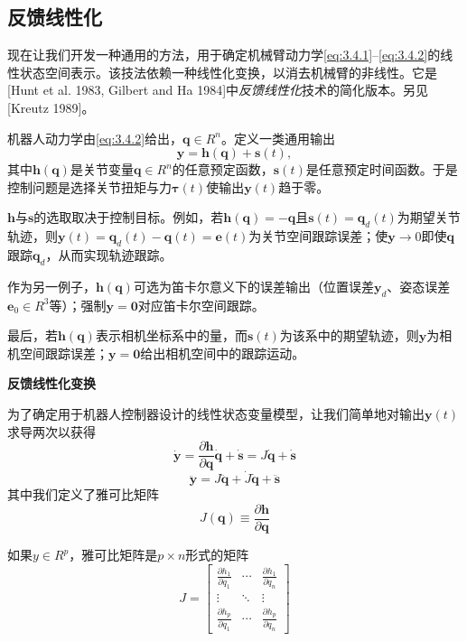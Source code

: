 \documentclass[12pt,a4paper]{ctexart}
\begin{document}
\subsection{反馈线性化}

现在让我们开发一种通用的方法，用于确定机械臂动力学\eqref{eq:3.4.1}--\eqref{eq:3.4.2}的线性状态空间表示。该技法依赖一种线性化变换，以消去机械臂的非线性。它是[Hunt et al. 1983, Gilbert and Ha 1984]中\emph{反馈线性化}技术的简化版本。另见[Kreutz 1989]。

机器人动力学由\eqref{eq:3.4.2}给出，$\bm{q}\in R^n$。定义一类通用输出
\begin{equation}\label{eq:3.4.24}
\bm{y} = \bm{h}(\bm{q}) + \bm{s}(t),
\end{equation}
其中$\bm{h}(\bm{q})$是关节变量$\bm{q}\in R^n$的任意预定函数，$\bm{s}(t)$是任意预定时间函数。于是控制问题是选择关节扭矩与力$\bm{\tau}(t)$使输出$\bm{y}(t)$趋于零。

$\bm{h}$与$\bm{s}$的选取取决于控制目标。例如，若$\bm{h}(\bm{q})=-\bm{q}$且$\bm{s}(t)=\bm{q}_d(t)$为期望关节轨迹，则$\bm{y}(t)=\bm{q}_d(t)-\bm{q}(t)=\bm{e}(t)$为关节空间跟踪误差；使$\bm{y}\to 0$即使$\bm{q}$跟踪$\bm{q}_d$，从而实现轨迹跟踪。

作为另一例子，$\bm{h}(\bm{q})$可选为笛卡尔意义下的误差输出（位置误差$\bm{y}_d$、姿态误差$\bm{e}_0\in R^3$等）；强制$\bm{y}=\bm{0}$对应笛卡尔空间跟踪。

最后，若$\bm{h}(\bm{q})$表示相机坐标系中的量，而$\bm{s}(t)$为该系中的期望轨迹，则$\bm{y}$为相机空间跟踪误差；$\bm{y}=\bm{0}$给出相机空间中的跟踪运动。

\textbf{反馈线性化变换}

为了确定用于机器人控制器设计的线性状态变量模型，让我们简单地对输出$\bm{y}(t)$求导两次以获得
\begin{equation}\label{eq:3.4.25}
\dot{\bm{y}} = \frac{\partial \bm{h}}{\partial \bm{q}}\dot{\bm{q}} + \dot{\bm{s}} = J\dot{\bm{q}} + \dot{\bm{s}}
\end{equation}
\begin{equation}\label{eq:3.4.26}
\ddot{\bm{y}} = J\ddot{\bm{q}} + \dot{J}\dot{\bm{q}} + \ddot{\bm{s}}
\end{equation}
其中我们定义了雅可比矩阵
\begin{equation}\label{eq:3.4.27}
J(\bm{q}) \equiv \frac{\partial \bm{h}}{\partial \bm{q}}
\end{equation}

如果$y \in R^p$，雅可比矩阵是$p \times n$形式的矩阵
\begin{equation}\label{eq:3.4.28}
J = \begin{bmatrix} \frac{\partial h_1}{\partial q_1} & \cdots & \frac{\partial h_1}{\partial q_n} \\ \vdots & \ddots & \vdots \\ \frac{\partial h_p}{\partial q_1} & \cdots & \frac{\partial h_p}{\partial q_n} \end{bmatrix}
\end{equation}
\end{document}

